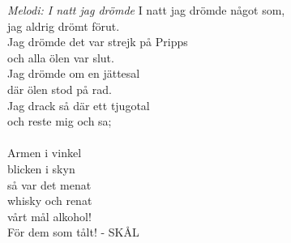 {\footnotesize\textit{Melodi: I natt jag drömde}}
\vspace{10pt}
I natt jag drömde något som,\\
jag aldrig drömt förut.\\
Jag drömde det var strejk på Pripps\\
och alla ölen var slut.\\
Jag drömde om en jättesal\\
där ölen stod på rad.\\
Jag drack så där ett tjugotal\\
och reste mig och sa;\\
\\
Armen i vinkel\\
blicken i skyn\\
så var det menat\\
whisky och renat\\
vårt mål alkohol!\\
För dem som tålt! - SKÅL
